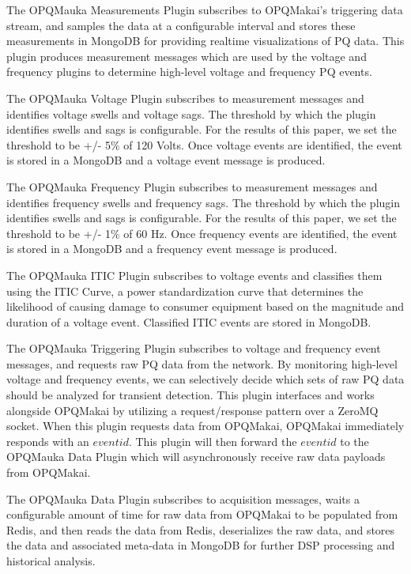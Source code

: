 \documentclass[a4paper, conference]{IEEEtran}
\begin{document}
The OPQMauka Measurements Plugin subscribes to OPQMakai's triggering data stream, and samples the data at a configurable interval and stores these measurements in MongoDB for providing realtime visualizations of PQ data. This plugin produces measurement messages which are used by the voltage and frequency plugins to determine high-level voltage and frequency PQ events.

The OPQMauka Voltage Plugin subscribes to measurement messages and identifies voltage swells and voltage sags. The threshold by which the plugin identifies swells and sags is configurable. For the results of this paper, we set the threshold to be +/- 5\% of 120 Volts. Once voltage events are identified, the event is stored in a MongoDB and a voltage event message is produced.

The OPQMauka Frequency Plugin subscribes to measurement messages and identifies frequency swells and frequency sags. The threshold by which the plugin identifies swells and sags is configurable. For the results of this paper, we set the threshold to be +/- 1\% of 60 Hz. Once frequency events are identified, the event is stored in a MongoDB and a frequency event message is produced.

The OPQMauka ITIC Plugin subscribes to voltage events and classifies them using the ITIC Curve\cite{ITIC}, a power standardization curve that determines the likelihood of causing damage to consumer equipment based on the magnitude and duration of a voltage event. Classified ITIC events are stored in MongoDB.

The OPQMauka Triggering Plugin subscribes to voltage and frequency event messages, and requests raw PQ data from the network. By monitoring high-level voltage and frequency events, we can selectively decide which sets of raw PQ data should be analyzed for transient detection. This plugin interfaces and works alongside OPQMakai by utilizing a request/response pattern over a ZeroMQ socket. When this plugin requests data from OPQMakai, OPQMakai immediately responds with an $event id$. This plugin will then forward the $event id$ to the OPQMauka Data Plugin which will asynchronously receive raw data payloads from OPQMakai.

The OPQMauka Data Plugin subscribes to acquisition messages, waits a configurable amount of time for raw data from OPQMakai to be populated from Redis, and then reads the data from Redis, deserializes the raw data, and stores the data and associated meta-data in MongoDB for further DSP processing and historical analysis. 
\end{document}
